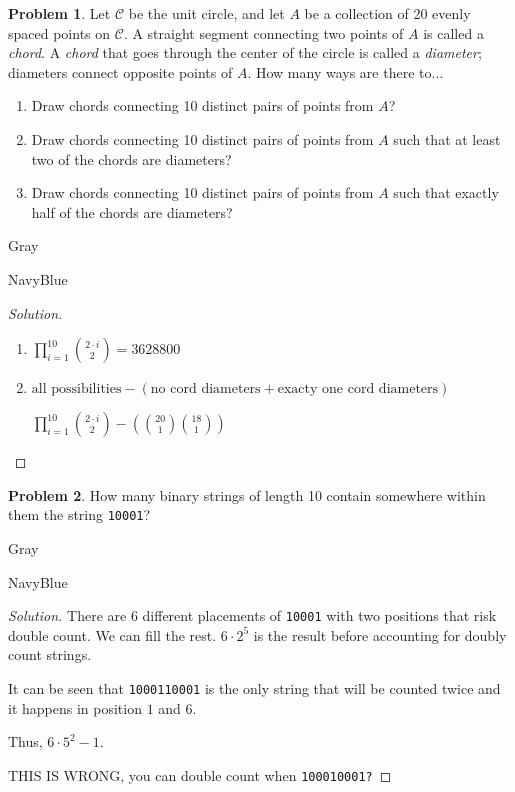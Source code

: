 \documentclass[12pt]{amsart}
\newcounter{problem_number}[section]
\theoremstyle{named}
\newenvironment{soln}
{\begin{color}{Gray}\begin{framed}\begin{color}{NavyBlue}\begin{proof}[Solution]
\doublespacing}
{\end{proof}\end{color}\end{framed}\end{color}}
\theoremstyle{definition}
\newtheorem{problem}{Problem}
\begin{document}
\begin{problem}
	Let $\mathcal C$ be the unit circle, and let $A$ be a collection of 20 evenly spaced points on $\mathcal C$.
	A straight segment connecting two points of $A$ is called a \emph{chord}.
	A \emph{chord} that goes through the center of the circle is called a \emph{diameter}; diameters connect opposite points of $A$.
	How many ways are there to...
	\begin{enumerate}
		\item Draw chords connecting 10 distinct pairs of points from $A$?
		\item Draw chords connecting 10 distinct pairs of points from $A$ such that at least two of the chords are diameters?
		\item Draw chords connecting 10 distinct pairs of points from $A$ such that exactly half of the chords are diameters?
	\end{enumerate}
\end{problem}

\begin{soln}
    \phantom{ }

    \begin{enumerate}
        \item $\displaystyle\prod_{i=1}^{10}{2\cdot i \choose 2} = 3628800$
        
        \phantom{ }
        
        \item $\text{all possibilities} - (\text{no cord diameters} + \text{exacty one cord diameters})$
        
		\noindent $\displaystyle\prod_{i=1}^{10}{2\cdot i \choose 2} - ({20 \choose 1}{18 \choose 1})
		$
    \end{enumerate}
\end{soln}

\begin{problem}
	How many binary strings of length 10 contain somewhere within them the string \verb|10001|?
\end{problem}

\begin{soln}
    \phantom{ }

    \noindent There are $6$ different placements of \verb|10001| with two positions
    that risk double count. We can fill the rest. $6 \cdot 2^5$ is the result
    before accounting for doubly count strings.

    \noindent It can be seen that \verb|1000110001| is the only string that will be counted
	twice and it happens in position $1$ and $6$.

    \noindent Thus, $6 \cdot 5^2 - 1$. 

	THIS IS WRONG, you can double count when \verb|100010001?|
\end{soln}
\end{document}
